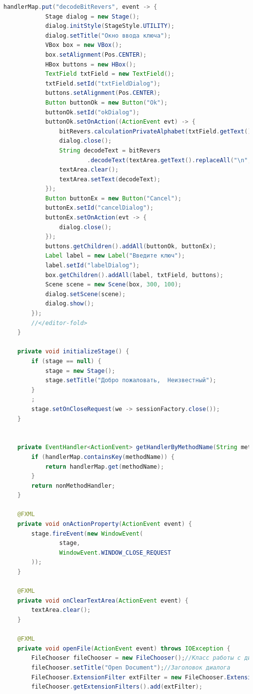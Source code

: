 \documentclass[a4paper,12pt]{article}
\begin{document}
\begin{lstlisting}[language=java, caption=код модуля MainWindowController.java]
        handlerMap.put("decodeBitRevers", event -> {
            Stage dialog = new Stage();
            dialog.initStyle(StageStyle.UTILITY);
            dialog.setTitle("Окно ввода ключа");
            VBox box = new VBox();
            box.setAlignment(Pos.CENTER);
            HBox buttons = new HBox();
            TextField txtField = new TextField();
            txtField.setId("txtFieldDialog");
            buttons.setAlignment(Pos.CENTER);
            Button buttonOk = new Button("Ok");
            buttonOk.setId("okDialog");
            buttonOk.setOnAction((ActionEvent evt) -> {
                bitRevers.calculationPrivateAlphabet(txtField.getText());
                dialog.close();
                String decodeText = bitRevers
                        .decodeText(textArea.getText().replaceAll("\n", " "));
                textArea.clear();
                textArea.setText(decodeText);
            });
            Button buttonEx = new Button("Cancel");
            buttonEx.setId("cancelDialog");
            buttonEx.setOnAction(evt -> {
                dialog.close();
            });
            buttons.getChildren().addAll(buttonOk, buttonEx);
            Label label = new Label("Введите ключ");
            label.setId("labelDialog");
            box.getChildren().addAll(label, txtField, buttons);
            Scene scene = new Scene(box, 300, 100);
            dialog.setScene(scene);
            dialog.show();
        });
        //</editor-fold>
    }

    private void initializeStage() {
        if (stage == null) {
            stage = new Stage();
            stage.setTitle("Добро пожаловать,  Неизвестный");
        }
        ;
        stage.setOnCloseRequest(we -> sessionFactory.close());
    }


    private EventHandler<ActionEvent> getHandlerByMethodName(String methodName) {
        if (handlerMap.containsKey(methodName)) {
            return handlerMap.get(methodName);
        }
        return nonMethodHandler;
    }

    @FXML
    private void onActionProperty(ActionEvent event) {
        stage.fireEvent(new WindowEvent(
                stage,
                WindowEvent.WINDOW_CLOSE_REQUEST
        ));
    }

    @FXML
    private void onClearTextArea(ActionEvent event) {
        textArea.clear();
    }

    @FXML
    private void openFile(ActionEvent event) throws IOException {
        FileChooser fileChooser = new FileChooser();//Класс работы с диалогом выборки и сохранения 
        fileChooser.setTitle("Open Document");//Заголовок диалога 
        FileChooser.ExtensionFilter extFilter = new FileChooser.ExtensionFilter("txt files (*.txt)", "*.txt");//Расширение 
        fileChooser.getExtensionFilters().add(extFilter);


\end{lstlisting}
\end{document}

